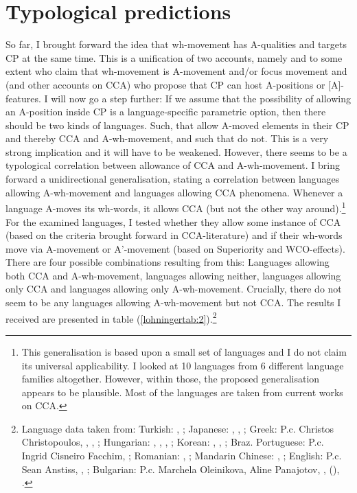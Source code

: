 \documentclass[output=paper,colorlinks,citecolor=brown]{langscibook}
\begin{document}
\section{Typological predictions}
So far, I brought forward the idea that wh-movement has A-qualities and targets CP at the same time. This is a unification of two accounts, namely \cite{richards1997} and to some extent \cite{bovskovic2002multiple} who claim that wh-movement is A-movement and/or focus movement and \cite{wurmbrand2018cross} (and other accounts on CCA) who propose that CP can host A-positions or [A]-features. I will now go a step further: If we assume that the possibility of allowing an A-position inside CP is a language-specific parametric option, then there should be two kinds of languages. Such, that allow A-moved elements in their CP and thereby CCA and A-wh-movement, and such that do not. This is a very strong implication and it will have to be weakened. However, there seems to be a typological correlation between allowance of CCA and A-wh-movement. I bring forward a unidirectional generalisation, stating a correlation between languages allowing A-wh-movement and languages allowing CCA phenomena.
\ea\label{lohningergeneralisation} Whenever a language A-moves its wh-words, it allows CCA (but not the other way around).\footnote{This generalisation is based upon a small set of languages and I do not claim its universal applicability. I looked at 10 languages from 6 different language families altogether. However, within those, the proposed generalisation appears to be plausible. Most of the languages are taken from current works on CCA.}
\z 
For the examined languages, I tested whether they allow some instance of CCA (based on the criteria brought forward in CCA-literature) and if their wh-words move via A-movement or A'-movement (based on Superiority and WCO-effects). There are four possible combinations resulting from this: Languages allowing both CCA and A-wh-movement, languages allowing neither, languages allowing only CCA and languages allowing only A-wh-movement. Crucially, there do not seem to be any languages allowing A-wh-movement but not CCA. The results I received are presented in table (\ref{lohningertab:2}).\footnote{Language data taken from: Turkish: \cite{ozsoy1996dependencies}, \cite{csener2011null}; Japanese: \cite{richards1997}, \cite{hiraiwa2001multiple}, \cite{watanabe1992subjacency}; Greek: P.c. Christos Christopoulos, \cite{sinopoulou2008multiple}, \cite{joseph1976raising}, \cite{alexiadou1999raising}; Hungarian: \cite{brody1995hungarian}, \cite{richards1997}, \cite{horvath1998multiple}, \cite{dendikken2017predication}; Korean: \cite{jeong2003deriving}, \cite{kim2016islands}, \cite{yoon2007raising}; Braz. Portuguese: P.c. Ingrid Cisneiro Facchim, \cite{nunes2009brazilian}; Romanian: \cite{rudin1988multiple}, \cite{rivero1991exceptional}; Mandarin Chinese: \cite{cheng1997typology}, \cite{richards1997}; English: P.c. Sean Anstiss, \cite{richards1997}, \cite{ross1967constraints}; Bulgarian: P.c. Marchela Oleinikova, Aline Panajotov, \cite{rudin21986aspects}, (\citeyear{rudin1988multiple}), \cite{richards1997}.
}
\end{document}
